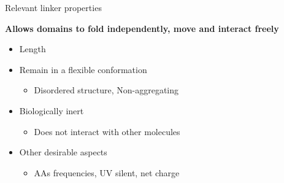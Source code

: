 \documentclass{beamer}
\begin{document}


\begin{frame}{Relevant linker properties}
\vspace{-20px}
\begin{adjustwidth}{-0.5em}{-1.5em}
\textbf{Allows domains to fold independently, move and interact freely}
 \end{adjustwidth}

 \vspace{10px}

\begin{itemize}
  \item Length
  \item Remain in a flexible conformation  %
    \begin{itemize}
     \item Disordered structure, Non-aggregating
    \end{itemize}

  \item Biologically inert  %
    \begin{itemize}
     \item Does not interact with other molecules
    \end{itemize}

  \item Other desirable aspects  %
    \begin{itemize}
     \item AAs frequencies, UV silent, net charge
    \end{itemize}
\end{itemize}
\end{frame}









\end{document}
